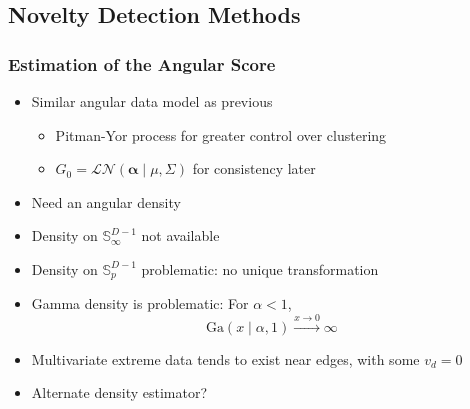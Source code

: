 \documentclass[aspectratio=169,10pt,notes]{beamer}
\begin{document}
\subsection{Novelty Detection Methods}

\begin{frame}
    \frametitle{Estimation of the Angular Score}
    \label{ndpg:estimationofangularscore}
    \begin{itemize}
        \item Similar angular data model as previous
        \begin{itemize}
            \item Pitman-Yor process for greater control over clustering
            \item $G_0 = \mathcal{LN}\left(\bm{\alpha}\mid\mu,\Sigma\right)$ 
                for consistency later
        \end{itemize}
        \item Need an angular density
        \item Density on $\mathbb{S}_{\infty}^{D-1}$ not available
        \item Density on $\mathbb{S}_p^{D-1}$ problematic: no unique transformation
        \item Gamma density is problematic: For $\alpha < 1$,
        \[
        \text{Ga}(x\mid\alpha, 1) \xrightarrow{x\to 0}{}\infty
        \]
        \item Multivariate extreme data tends to exist near edges, with some $v_d = 0$
        \item Alternate density estimator?
    \end{itemize}
    \hyperlink{ndpg:angulardatamodel}{}
\end{frame}
\end{document}
